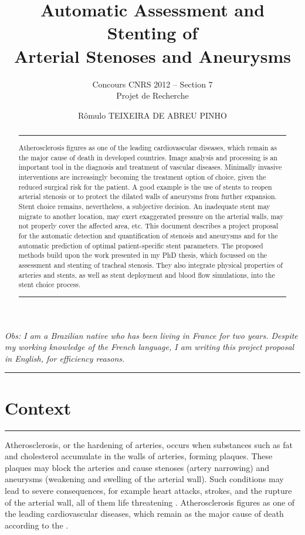 \documentclass[a4paper]{article}
\title{Automatic Assessment and Stenting of\\Arterial Stenoses and Aneurysms}
\author{Concours CNRS 2012 -- Section 7\\Projet de Recherche}
\date{R\^omulo TEIXEIRA DE ABREU PINHO}
\begin{document}
\maketitle

\begin{noindent}
{\em Obs: I am a Brazilian native who has been living in France for two years. Despite my working knowledge of the French language, I am writing this project proposal in English, for efficiency reasons.}
\end{noindent}

\begin{abstract}
\hrule
\medskip
Atherosclerosis figures as one of the leading cardiovascular diseases, which remain as the major cause of death in developed countries. Image analysis and processing is an important tool in the diagnosis and treatment of vascular diseases. Minimally invasive interventions are increasingly becoming the treatment option of choice, given the reduced surgical risk for the patient. A good example is the use of stents to reopen arterial stenosis or to protect the dilated walls of aneurysms from further expansion. Stent choice remains, nevertheless, a subjective decision. An inadequate stent may migrate to another location, may exert exaggerated pressure on the arterial walls, may not properly cover the affected area, etc. This document describes a project proposal for the automatic detection and quantification of stenosis and aneurysms and for the automatic prediction of optimal patient-specific stent parameters. The proposed methods build upon the work presented in my PhD thesis, which focussed on the assessment and stenting of tracheal stenosis. They also integrate physical properties of arteries and stents, as well as stent deployment and blood flow simulations, into the stent choice process. 
\medskip
\hrule
\end{abstract}


\tableofcontents

\pagebreak

\hrule
\section{Context}
\hrule

\medskip
\medskip

Atherosclerosis, or the hardening of arteries, occurs when substances such as fat and cholesterol accumulate in the walls of arteries, forming plaques. These plaques may block the arteries and cause stenoses (artery narrowing) and aneurysms (weakening and swelling of the arterial wall). Such conditions may lead to severe consequences, for example heart attacks, strokes, and the rupture of the arterial wall, all of them life threatening \citep{Gennest,Libby}. Atherosclerosis figures as one of the leading cardiovascular diseases, which remain as the major cause of death according to the \citet{WHO}. 
\end{document}
